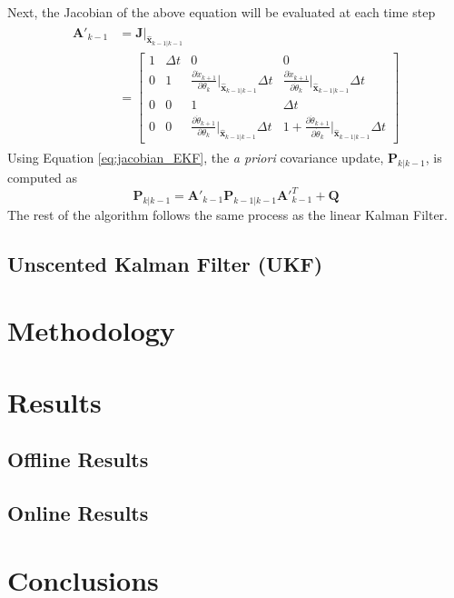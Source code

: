 \documentclass{article}
\newcommand{\matr}[1]{\bm{#1}}     %
\begin{document}
Next, the Jacobian of the above equation will be evaluated at each time step
\begin{align}
\begin{aligned}
\matr{A'}_{k-1} &= \matr{J}\bigr|_{\hat{\matr{x}}_{k-1|k-1}} \\
&= \begin{bmatrix}
1 & \Delta t & 0 & 0 \\[8pt]
0 & 1 & \frac{\partial \dot{x}_{k+1}}{\partial \theta_k}\Big|_{\hat{\matr{x}}_{k-1|k-1}}\Delta t & \frac{\partial \dot{x}_{k+1}}{\partial \dot{\theta}_k}\Big|_{\hat{\matr{x}}_{k-1|k-1}}\Delta t \\[8pt]
0 & 0 & 1 & \Delta t \\[8pt]
0 & 0 & \frac{\partial \dot{\theta}_{k+1}}{\partial \theta_k}\Big|_{\hat{\matr{x}}_{k-1|k-1}}\Delta t & 1+\frac{\partial \dot{\theta}_{k+1}}{\partial \dot{\theta}_k}\Big|_{\hat{\matr{x}}_{k-1|k-1}}\Delta t
\end{bmatrix}
\end{aligned}
\label{eq:jacobian_EKF}
\end{align}
Using Equation \ref{eq:jacobian_EKF}, the \textit{a priori} covariance update, $\matr{P}_{k|k-1}$, is computed as
\begin{equation}
\matr{P}_{k|k-1} = \matr{A}'_{k-1} \matr{P}_{k-1|k-1} {\matr{A}'}_{k-1}^T + \matr{Q}
\end{equation}
The rest of the algorithm follows the same process as the linear Kalman Filter. 
\subsection{Unscented Kalman Filter (UKF)}

\section{Methodology}

\section{Results}
\subsection{Offline Results}
\subsection{Online Results}

\section{Conclusions}
\end{document}

